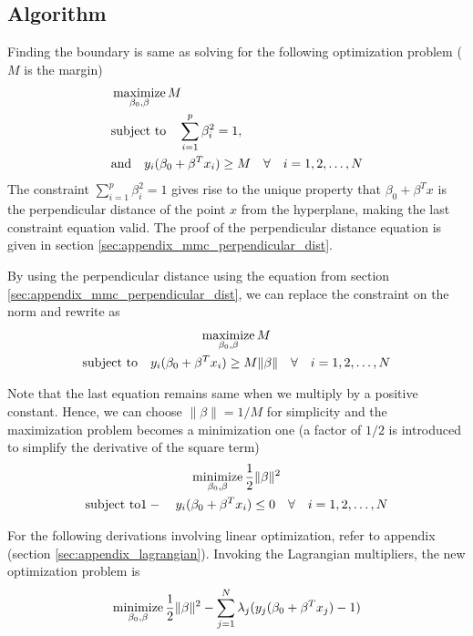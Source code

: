 \documentclass[../statistical_learning_notes.tex]{subfiles}
\begin{document}
    \subsection{Algorithm}
    Finding the boundary is same as solving for the following optimization problem ($M$ is the margin)
    \begin{align*}
        &\operatorname*{maximize}_{\beta_{0}, \beta} M\\
        &\text{subject to} \quad \sum_{i=1}^{p} \beta_{i}^{2} = 1,\\
        &\text{and} \quad y_{i}(\beta_{0} + \beta^{T}x_{i}) \geq M \quad \forall \quad i = 1, 2, \ldots, N
    \end{align*}
    The constraint $\sum_{i=1}^{p} \beta_{i}^{2} = 1$ gives rise to the unique property that $\beta_{0} + \beta^{T}x$ is the perpendicular distance of the point $x$ from the hyperplane, making the last constraint equation valid. The proof of the perpendicular distance equation is given in section \ref{sec:appendix_mmc_perpendicular_dist}.\newline

    By using the perpendicular distance using the equation from section \ref{sec:appendix_mmc_perpendicular_dist}, we can replace the constraint on the norm and rewrite as
    \begin{gather*}
        \operatorname*{maximize}_{\beta_{0}, \beta} M\\
        \text{subject to} \quad y_{i}(\beta_{0} + \beta^{T}x_{i}) \geq M \lVert \beta \rVert \quad \forall \quad i = 1, 2, \ldots, N
    \end{gather*}

    Note that the last equation remains same when we multiply by a positive constant. Hence, we can choose $\lVert \beta \rVert = 1/M$ for simplicity and the maximization problem becomes a minimization one (a factor of $1/2$ is introduced to simplify the derivative of the square term)
    \begin{gather*}
        \operatorname*{minimize}_{\beta_{0}, \beta}  \frac{1}{2}\lVert \beta \rVert^{2}\\
        \text{subject to} 1 - \quad y_{i}(\beta_{0} + \beta^{T}x_{i}) \leq 0 \quad \forall \quad i = 1, 2, \ldots, N
    \end{gather*}

    For the following derivations involving linear optimization, refer to appendix (section \ref{sec:appendix_lagrangian}).\newline
    Invoking the Lagrangian multipliers, the new optimization problem is
    \begin{align*}
        \operatorname*{minimize}_{\beta_{0},\beta}  \frac{1}{2}\lVert \beta \rVert^{2} - \sum_{j=1}^{N} \lambda_{j} (y_{j}(\beta_{0} + \beta^{T}x_{j}) - 1)
    \end{align*}
\end{document}
